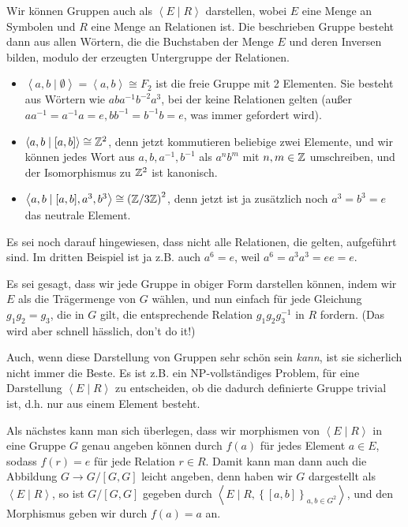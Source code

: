 \begin{recap}
Wir können Gruppen auch als $\left< E \mid  R \right> $ darstellen, wobei $E$ eine Menge an Symbolen und  $R$ eine Menge an Relationen ist. Die beschrieben Gruppe besteht dann aus allen Wörtern, die die Buchstaben der Menge  $E$ und deren Inversen bilden, modulo der erzeugten Untergruppe der Relationen. \\
\begin{itemize}
    \item $\left< a,b \mid \emptyset \right>  = \left< a,b \right>  \cong F_2$ ist die freie Gruppe mit 2 Elementen. Sie besteht aus Wörtern wie $aba^{-1}b^{-2}a^3$, bei der keine Relationen gelten (außer $a a^{-1} = a^{-1}a = e, b b^{-1} = b^{-1} b = e$, was immer gefordert  wird).
    \item $\left< a,b \mid  [a,b] \right> \cong \mathbb{Z}^2$, denn jetzt kommutieren beliebige zwei Elemente, und wir können jedes Wort aus  $a,b,a^{-1},b^{-1}$ als $a^nb^m$ mit  $n,m \in \mathbb{Z}$ umschreiben, und der Isomorphismus zu $\mathbb{Z}^2$ ist kanonisch.
    \item $\left< a,b \mid  [a,b], a^3, b^3 \right> \cong \left( \mathbb{Z} / 3\mathbb{Z} \right) ^2$, denn jetzt ist ja zusätzlich noch $a^3 = b^3 = e$ das neutrale Element.
\end{itemize}
\begin{warning}
    Es sei noch darauf hingewiesen, dass nicht alle Relationen, die gelten, aufgeführt sind. Im dritten Beispiel ist ja z.B. auch $a^6 = e$, weil  $a^6 = a^3 a^3 = e e = e$.
\end{warning}
Es sei gesagt, dass wir jede Gruppe in obiger Form darstellen können, indem wir $E$ als die Trägermenge von  $G$ wählen, und nun einfach für jede Gleichung  $g_1g_2 = g_3$, die in $G$ gilt, die entsprechende Relation  $g_1g_2g_3^{-1}$ in $R$ fordern. (Das wird aber schnell hässlich, don't do it!)

\begin{warning}
    Auch, wenn diese Darstellung von Gruppen sehr schön sein \textit{kann}, ist sie sicherlich nicht immer die Beste. Es ist z.B. ein NP-vollständiges Problem, für eine Darstellung $\left< E \mid  R \right> $ zu entscheiden, ob die dadurch definierte Gruppe trivial ist, d.h. nur aus einem Element besteht.
\end{warning}
Als nächstes kann man sich überlegen, dass wir morphismen von $\left< E \mid  R \right> $ in eine Gruppe $G$ genau angeben können durch  $f(a)$ für jedes Element  $a\in E$, sodass $f(r) = e$ für jede Relation  $r\in R$. Damit kann man dann auch die Abbildung $G \to  G / [G,G]$ leicht angeben, denn haben wir $G$ dargestellt als  $\left< E \mid  R \right> $, so ist $G / [G,G]$ gegeben durch  $\left< E \mid R, \left \{[a,b]\right\} _{a,b\in G^2} \right> $, und den Morphismus geben wir durch $f(a) = a$ an.
\end{recap}

